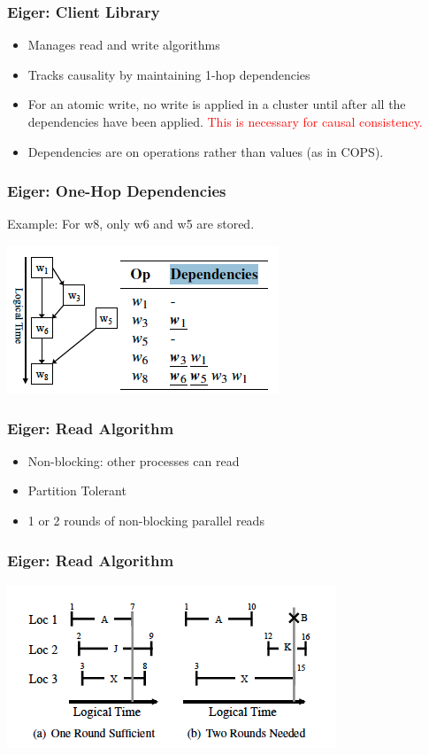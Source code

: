 \documentclass{beamer}
\begin{document}
\begin{frame}
\frametitle{Eiger: Client Library}
\begin{itemize}
\item Manages read and write algorithms
\item Tracks causality by maintaining 1-hop dependencies
\item For an atomic write, no write is applied in a cluster until after all the dependencies have been applied.  \textcolor{red}{This is necessary for causal consistency.}
\item Dependencies are on operations rather than values (as in COPS). 
\end{itemize}  
\end{frame}

\begin{frame}
\frametitle{Eiger: One-Hop Dependencies}

Example:  For w8, only w6 and w5 are stored.

\includegraphics[scale=0.5]{Figure_Dependencies.png}
\end{frame}

\begin{frame}
\frametitle{Eiger: Read Algorithm}
\begin{itemize}
\item Non-blocking: other processes can read
\item Partition Tolerant
\item 1 or 2 rounds of non-blocking parallel reads
\end{itemize}  
\end{frame}

\begin{frame}
\frametitle{Eiger: Read Algorithm}
\includegraphics[scale=0.80]{Figure_Read.png}
\end{frame}
\end{document}
